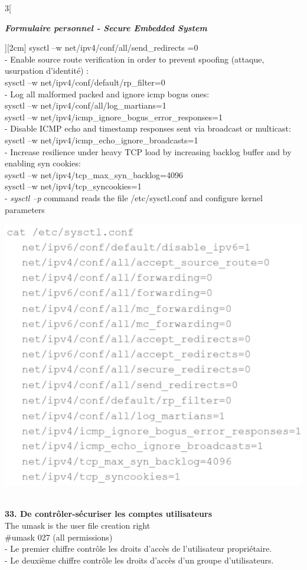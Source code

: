 \begin{multicols}{3}[\centerline{ \large\em \textbf{Formulaire personnel - Secure Embedded System}}][2cm]
sysctl –w net/ipv4/conf/all/send\_redirects =0\\
- Enable source route verification in order to prevent spoofing (attaque, usurpation d'identité) : \\
sysctl –w net/ipv4/conf/default/rp\_filter=0\\
- Log all malformed packed and ignore icmp bogus ones:\\
sysctl –w net/ipv4/conf/all/log\_martians=1\\
sysctl –w net/ipv4/icmp\_ignore\_bogus\_error\_responses=1\\
- Disable ICMP echo and timestamp responses sent via broadcast or multicast:\\
sysctl –w net/ipv4/icmp\_echo\_ignore\_broadcasts=1\\
- Increase resilience under heavy TCP load by increasing backlog buffer and by enabling syn cookies:\\
sysctl –w net/ipv4/tcp\_max\_syn\_backlog=4096\\
sysctl –w net/ipv4/tcp\_syncookies=1\\
- \textit{sysctl –p} command reads the file /etc/sysctl.conf and configure kernel parameters\\
\begin{minipage}{\linewidth}
	\centering
    \includegraphics[width =0.6\columnwidth]{images/18.png}
\end{minipage}
\\ \textbf{33. De contrôler-sécuriser les comptes utilisateurs\\}
The umask is the user file creation right\\
\#umask 027 (all permissions)\\
- Le premier chiffre contrôle les droits d'accès de l'utilisateur propriétaire.\\
- Le deuxième chiffre contrôle les droits d'accès d'un groupe d'utilisateurs.\\

\end{multicols}
